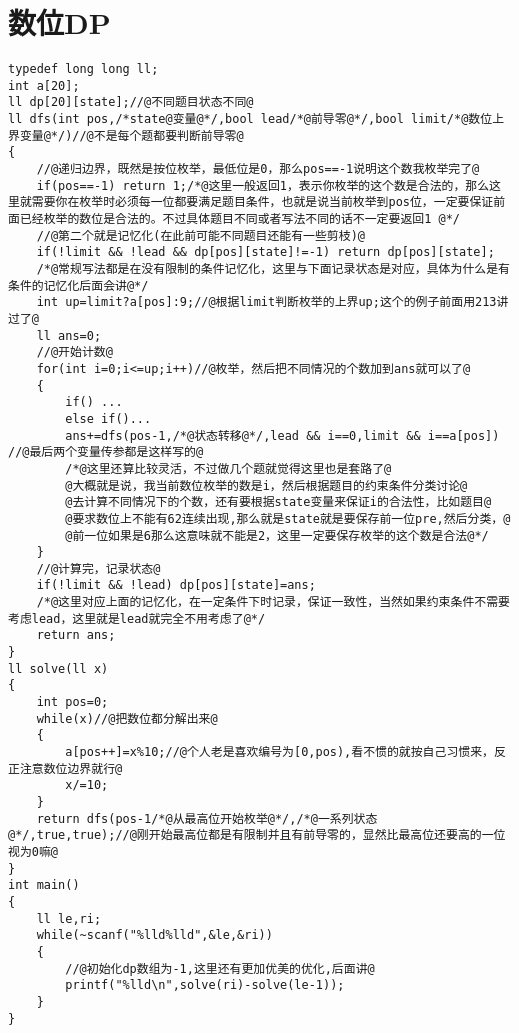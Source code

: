 \section{数位DP}



\begin{lstlisting}
typedef long long ll;
int a[20];
ll dp[20][state];//@不同题目状态不同@
ll dfs(int pos,/*state@变量@*/,bool lead/*@前导零@*/,bool limit/*@数位上界变量@*/)//@不是每个题都要判断前导零@
{
    //@递归边界，既然是按位枚举，最低位是0，那么pos==-1说明这个数我枚举完了@
    if(pos==-1) return 1;/*@这里一般返回1，表示你枚举的这个数是合法的，那么这里就需要你在枚举时必须每一位都要满足题目条件，也就是说当前枚举到pos位，一定要保证前面已经枚举的数位是合法的。不过具体题目不同或者写法不同的话不一定要返回1 @*/
    //@第二个就是记忆化(在此前可能不同题目还能有一些剪枝)@
    if(!limit && !lead && dp[pos][state]!=-1) return dp[pos][state];
    /*@常规写法都是在没有限制的条件记忆化，这里与下面记录状态是对应，具体为什么是有条件的记忆化后面会讲@*/
    int up=limit?a[pos]:9;//@根据limit判断枚举的上界up;这个的例子前面用213讲过了@
    ll ans=0;
    //@开始计数@
    for(int i=0;i<=up;i++)//@枚举，然后把不同情况的个数加到ans就可以了@
    {
        if() ...
        else if()...
        ans+=dfs(pos-1,/*@状态转移@*/,lead && i==0,limit && i==a[pos]) //@最后两个变量传参都是这样写的@
        /*@这里还算比较灵活，不过做几个题就觉得这里也是套路了@
        @大概就是说，我当前数位枚举的数是i，然后根据题目的约束条件分类讨论@
        @去计算不同情况下的个数，还有要根据state变量来保证i的合法性，比如题目@
        @要求数位上不能有62连续出现,那么就是state就是要保存前一位pre,然后分类，@
        @前一位如果是6那么这意味就不能是2，这里一定要保存枚举的这个数是合法@*/
    }
    //@计算完，记录状态@
    if(!limit && !lead) dp[pos][state]=ans;
    /*@这里对应上面的记忆化，在一定条件下时记录，保证一致性，当然如果约束条件不需要考虑lead，这里就是lead就完全不用考虑了@*/
    return ans;
}
ll solve(ll x)
{
    int pos=0;
    while(x)//@把数位都分解出来@
    {
        a[pos++]=x%10;//@个人老是喜欢编号为[0,pos),看不惯的就按自己习惯来，反正注意数位边界就行@
        x/=10;
    }
    return dfs(pos-1/*@从最高位开始枚举@*/,/*@一系列状态 @*/,true,true);//@刚开始最高位都是有限制并且有前导零的，显然比最高位还要高的一位视为0嘛@
}
int main()
{
    ll le,ri;
    while(~scanf("%lld%lld",&le,&ri))
    {
        //@初始化dp数组为-1,这里还有更加优美的优化,后面讲@
        printf("%lld\n",solve(ri)-solve(le-1));
    }
}
\end{lstlisting}

